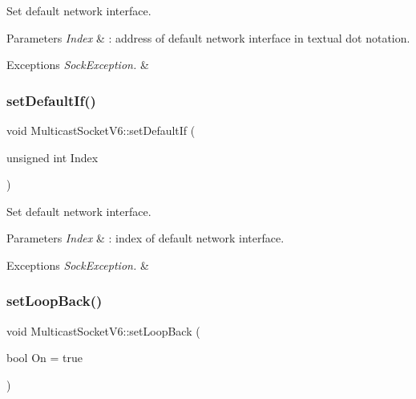 Set default network interface. 
\begin{DoxyParams}{Parameters}
{\em Index} & \+: address of default network interface in textual dot notation. \\
\hline
\end{DoxyParams}

\begin{DoxyExceptions}{Exceptions}
{\em Sock\+Exception.} & \\
\hline
\end{DoxyExceptions}
\mbox{\label{classMulticastSocketV6_a4e211b18653d1a8ce29651068293960b}} 
\subsubsection{\texorpdfstring{set\+Default\+If()}{setDefaultIf()}\hspace{0.1cm}{\footnotesize\ttfamily [3/3]}}
{\footnotesize\ttfamily void Multicast\+Socket\+V6\+::set\+Default\+If (\begin{DoxyParamCaption}\item[{unsigned int}]{Index }\end{DoxyParamCaption})\hspace{0.3cm}{\ttfamily [private]}}

Set default network interface. 
\begin{DoxyParams}{Parameters}
{\em Index} & \+: index of default network interface. \\
\hline
\end{DoxyParams}

\begin{DoxyExceptions}{Exceptions}
{\em Sock\+Exception.} & \\
\hline
\end{DoxyExceptions}
\mbox{\label{classMulticastSocketV6_a04dea92292a94e6f395de06edf063711}} 
\subsubsection{\texorpdfstring{set\+Loop\+Back()}{setLoopBack()}}
{\footnotesize\ttfamily void Multicast\+Socket\+V6\+::set\+Loop\+Back (\begin{DoxyParamCaption}\item[{bool}]{On = {\ttfamily true} }\end{DoxyParamCaption})}

